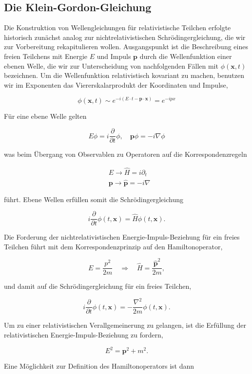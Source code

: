\documentclass[10pt, letterpaper]{article}
\begin{document}
\subsection{Die Klein-Gordon-Gleichung}
Die Konstruktion von Wellengleichungen für relativistische Teilchen erfolgte historisch zunächst analog zur nichtrelativistischen Schrödingergleichung, die wir zur Vorbereitung rekapitulieren wollen. Ausgangspunkt ist die Beschreibung eines freien Teilchens mit Energie $E$ und Impuls $\mathbf{p}$ durch die Wellenfunktion einer ebenen Welle, die wir zur Unterscheidung von nachfolgenden Fällen mit $\phi(\mathbf{x}, t)$ bezeichnen. Um die Wellenfunktion relativistisch kovariant zu machen, benutzen wir im Exponenten das Viererskalarprodukt der Koordinaten und Impulse,

$$
\phi(\mathbf{x}, t) \sim e^{-i(E \cdot t-\mathbf{p} \cdot \mathbf{x})}=e^{-i p x}
$$

Für eine ebene Welle gelten

$$
E \phi=i \frac{\partial}{\partial t} \phi, \quad \mathbf{p} \phi=-i \nabla \phi
$$

was beim Übergang von Observablen zu Operatoren auf die Korrespondenzregeln

$$
\begin{aligned}
& E \rightarrow \hat{H}=i \partial_{t} \\
& \mathbf{p} \rightarrow \hat{\mathbf{p}}=-i \nabla
\end{aligned}
$$

führt. Ebene Wellen erfüllen somit die Schrödingergleichung

$$
i \frac{\partial}{\partial t} \phi(t, \mathbf{x})=\hat{H} \phi(t, \mathbf{x}) .
$$

Die Forderung der nichtrelativistischen Energie-Impuls-Beziehung für ein freies Teilchen führt mit dem Korrespondenzprinzip auf den Hamiltonoperator,

$$
E=\frac{p^{2}}{2 m} \quad \Rightarrow \quad \hat{H}=\frac{\hat{\mathbf{p}}^{2}}{2 m},
$$

und damit auf die Schrödingergleichung für ein freies Teilchen,

$$
i \frac{\partial}{\partial t} \phi(t, \mathbf{x})=-\frac{\nabla^{2}}{2 m} \phi(t, \mathbf{x}) .
$$

Um zu einer relativistischen Verallgemeinerung zu gelangen, ist die Erfüllung der relativistischen Energie-Impuls-Beziehung zu fordern,

$$
E^{2}=\mathbf{p}^{2}+m^{2} .
$$

Eine Möglichkeit zur Definition des Hamiltonoperators ist dann
\end{document}
